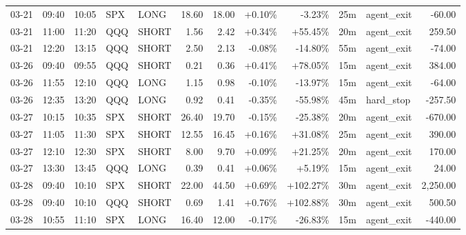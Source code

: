 \documentclass[11pt,a4paper]{article}
\begin{document}
\begin{center}
\begin{longtable}{>{\color{txtmain}}l l l l l r r r r r >{\color{txtmain}}l r}
03-21 & 09:40 & 10:05 & SPX & LONG & 18.60 & 18.00 & \textcolor{wingreen}{+0.10\%} & \textcolor{lossred}{-3.23\%} & 25m & agent\_exit & \textcolor{lossred}{-60.00} \\
03-21 & 11:00 & 11:20 & QQQ & SHORT & 1.56 & 2.42 & \textcolor{wingreen}{+0.34\%} & \textcolor{wingreen}{+55.45\%} & 20m & agent\_exit & \textcolor{wingreen}{259.50} \\
03-21 & 12:20 & 13:15 & QQQ & SHORT & 2.50 & 2.13 & \textcolor{lossred}{-0.08\%} & \textcolor{lossred}{-14.80\%} & 55m & agent\_exit & \textcolor{lossred}{-74.00} \\
03-26 & 09:40 & 09:55 & QQQ & SHORT & 0.21 & 0.36 & \textcolor{wingreen}{+0.41\%} & \textcolor{wingreen}{+78.05\%} & 15m & agent\_exit & \textcolor{wingreen}{384.00} \\
03-26 & 11:55 & 12:10 & QQQ & LONG & 1.15 & 0.98 & \textcolor{lossred}{-0.10\%} & \textcolor{lossred}{-13.97\%} & 15m & agent\_exit & \textcolor{lossred}{-64.00} \\
03-26 & 12:35 & 13:20 & QQQ & LONG & 0.92 & 0.41 & \textcolor{lossred}{-0.35\%} & \textcolor{lossred}{-55.98\%} & 45m & hard\_stop & \textcolor{lossred}{-257.50} \\
03-27 & 10:15 & 10:35 & SPX & SHORT & 26.40 & 19.70 & \textcolor{lossred}{-0.15\%} & \textcolor{lossred}{-25.38\%} & 20m & agent\_exit & \textcolor{lossred}{-670.00} \\
03-27 & 11:05 & 11:30 & SPX & SHORT & 12.55 & 16.45 & \textcolor{wingreen}{+0.16\%} & \textcolor{wingreen}{+31.08\%} & 25m & agent\_exit & \textcolor{wingreen}{390.00} \\
03-27 & 12:10 & 12:30 & SPX & SHORT & 8.00 & 9.70 & \textcolor{wingreen}{+0.09\%} & \textcolor{wingreen}{+21.25\%} & 20m & agent\_exit & \textcolor{wingreen}{170.00} \\
03-27 & 13:30 & 13:45 & QQQ & LONG & 0.39 & 0.41 & \textcolor{wingreen}{+0.06\%} & \textcolor{wingreen}{+5.19\%} & 15m & agent\_exit & \textcolor{wingreen}{24.00} \\
03-28 & 09:40 & 10:10 & SPX & SHORT & 22.00 & 44.50 & \textcolor{wingreen}{+0.69\%} & \textcolor{wingreen}{+102.27\%} & 30m & agent\_exit & \textcolor{wingreen}{2,250.00} \\
03-28 & 09:40 & 10:10 & QQQ & SHORT & 0.69 & 1.41 & \textcolor{wingreen}{+0.76\%} & \textcolor{wingreen}{+102.88\%} & 30m & agent\_exit & \textcolor{wingreen}{500.50} \\
03-28 & 10:55 & 11:10 & SPX & LONG & 16.40 & 12.00 & \textcolor{lossred}{-0.17\%} & \textcolor{lossred}{-26.83\%} & 15m & agent\_exit & \textcolor{lossred}{-440.00} \\

\end{longtable}
\end{center}
\end{document}
